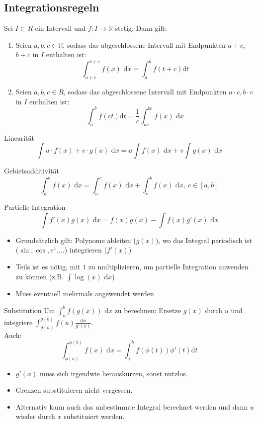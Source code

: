 \documentclass[a4paper,8pt]{extarticle}
\def\R{\mathbb{R}}
\def\dx{\text{ d}x}
\begin{document}
\subsection{Integrationsregeln}
\begin{subbox}{}
  Sei $I \subset R$ ein Intervall und $f : I \rightarrow \R$ stetig. Dann gilt:
  \begin{enumerate}
    \item Seien $a, b, c \in \R$, sodass das abgeschlossene Intervall mit Endpunkten $a + c$, $b + c$ in $I$ enthalten ist:
    $$\int_{a+c}^{b+c} f(x)\dx = \int_a^b f(t + c)\text{d}t$$
    \item Seien $a, b, c \in R$, sodass das abgeschlossene Intervall mit Endpunkten $a \cdot c, b \cdot c$ in $I$ enthalten ist: 
    $$\int_a^b f(ct)\text{d}t = \frac{1}{c}\int_{ac}^{bc} f(x)\dx$$
\end{enumerate}
\end{subbox}
\begin{subbox}{Linearität}
 $$\int u\cdot f(x) + v \cdot g(x) \dx = u \int f(x) \dx + v \int g(x) \dx$$
\end{subbox}
\begin{subbox}{Gebietsadditivität}
 $$\int_a^b f(x) \dx = \int_a^c f(x) \dx + \int_c^b f(x) \dx, \ c \in [a,b]$$
\end{subbox}
\begin{mainbox}{Partielle Integration}
 $$\int f'(x) g(x) \dx = f(x)g(x) - \int f(x) g'(x) \dx$$
\end{mainbox}
\begin{itemize}
 \item Grundsätzlich gilt: Polynome ableiten ($g(x)$), wo das Integral periodisch ist ($\sin, \cos, e^x$,...) integrieren ($f'(x)$)
 \item Teils ist es nötig, mit $1$ zu multiplizieren, um partielle Integration anwenden zu können (z.B. $\int \log(x) \dx$)
 \item Muss eventuell mehrmals angewendet werden
\end{itemize}
\begin{mainbox}{Substitution}
 Um $\int_a^b f(g(x)) \dx$ zu berechnen: Ersetze $g(x)$ durch $u$ und integriere $\int_{g(a)}^{g(b)} f(u) \frac{\text{d}u}{g'(x)}$.
 \\ Auch:
 $$\int_{\phi(a)}^{\phi(b)}f(x)\dx = \int_a^b f(\phi(t))\phi'(t)\text{d}t$$
\end{mainbox}
\begin{itemize}
 \item $g'(x)$ muss sich irgendwie herauskürzen, sonst nutzlos.
 \item Grenzen substituieren nicht vergessen.
 \item Alternativ kann auch das unbestimmte Integral berechnet werden und dann $u$ wieder durch $x$ substituiert werden.
\end{itemize}
\end{document}
